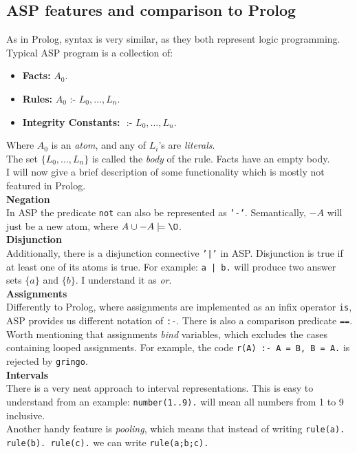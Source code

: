\documentclass[11pt]{article}
\begin{document}
\subsection{ASP features and comparison to Prolog}
As in Prolog, syntax is very similar, as they both represent logic programming.
Typical ASP program is a collection of:
\begin{itemize}
\item \textbf{Facts:} $A_0.$
\item \textbf{Rules:} $A_0 $ :- $ L_0,...,L_n.$
\item \textbf{Integrity Constants:} $ $ :- $ L_0,...,L_n.$
\end{itemize}
Where $A_0$ is an \emph{atom}, and any of $L_i$'s are \emph{literals}.\\
The set $\{L_0,...,L_n\}$ is called the \emph{body} of the rule. Facts have an empty body.\\

I will now give a brief description of some functionality which is mostly not featured in Prolog.\\

\textbf{Negation}\\
In ASP the predicate \texttt{not} can also be represented as \texttt{'-'}. Semantically, $-A$ will just be a new atom, where $A \cup -A \models {\O}$.\\

\textbf{Disjunction}\\
Additionally, there is a disjunction connective \texttt{'|'} in ASP. Disjunction is true if at least one of its atoms is true. For example: \texttt{a | b.} will produce two answer sets $\{a\}$ and $\{b\}$. I understand it as \emph{or}.\\

\textbf{Assignments}\\
Differently to Prolog, where assignments are implemented as an infix operator \texttt{is}, ASP provides us different notation of \texttt{:-}. There is also a comparison predicate \texttt{==}.\\ Worth mentioning that assignments \emph{bind} variables, which excludes the cases containing looped assignments. For example, the code \texttt{r(A) :- A = B, B = A.} is rejected by \texttt{gringo}.\\

\textbf{Intervals}\\
There is a very neat approach to interval representations. This is easy to understand from an example: \texttt{number(1..9).} will mean all numbers from 1 to 9 inclusive.\\Another handy feature is \emph{pooling}, which means that instead of writing \texttt{rule(a). rule(b). rule(c).} we can write \texttt{rule(a;b;c).}\\
\end{document}
